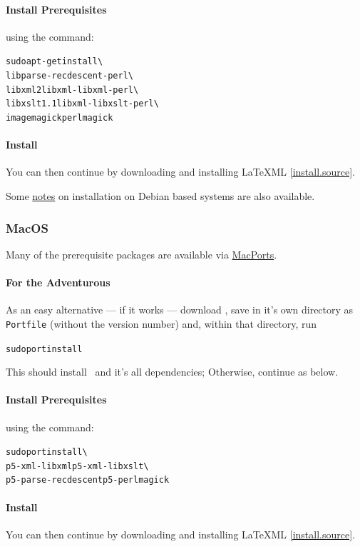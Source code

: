 \documentclass{article}
\begin{document}
\paragraph{Install Prerequisites} using the command:
\begin{alltt}
   sudo apt-get install   \textbackslash\\
      libparse-recdescent-perl \textbackslash\\
      libxml2 libxml-libxml-perl \textbackslash\\
      libxslt1.1 libxml-libxslt-perl  \textbackslash\\
      imagemagick perlmagick
\end{alltt}
\paragraph{Install}
You can then continue by downloading and installing LaTeXML \ref{install.source}.

Some \href{http://rhaptos.org/devblog/reedstrm/latexml}{notes} on installation on Debian
based systems are also available.

\subsubsection{MacOS}\label{install.macos}
Many of the prerequisite packages are available via
\href{http://www.macports.org}{MacPorts}.
\paragraph{For the Adventurous}  As an easy alternative --- if it works ---
download \CurrentMacOS, save in it's own directory as \texttt{Portfile}
(without the version number) and, within that directory, run
\begin{alltt}
  sudo port install
\end{alltt}
This should install \LaTeXML\ and it's all dependencies;
Otherwise, continue as below.
\paragraph{Install Prerequisites} using the command:
\begin{alltt}
  sudo port install    \textbackslash\\
      p5-xml-libxml p5-xml-libxslt  \textbackslash\\
      p5-parse-recdescent p5-perlmagick
\end{alltt}
\paragraph{Install}
You can then continue by downloading and installing LaTeXML \ref{install.source}.
\end{document}
